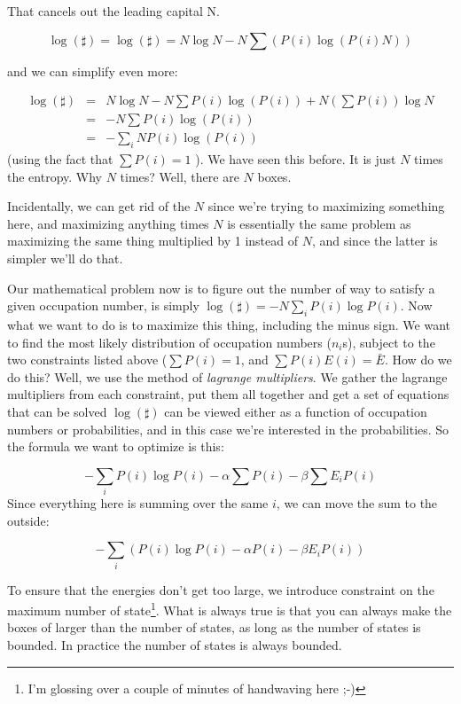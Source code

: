 \documentclass[a4, 12pt, english, USenglish]{scrreprt}
\newcommand{\parens}[1]{\ensuremath{\left({#1}\right)}}
\newcommand{\idx}[1]{{\em #1}\index{#1}}
\begin{document}
That cancels out the leading capital N.

\[
 \log(\sharp) = \log(\sharp) = N \log N  - N \sum\parens{P(i) \log\parens{P(i) N}}
\]
 
and we can simplify even more:

\[
\begin{array}{lcl}
 \log(\sharp) &=& N \log N - N \sum P(i) \log(P(i))+   N \parens{\sum P(i)} \log N\\
&=& - N \sum P(i) \log(P(i)) \\
&=& -  \sum_i N P(i) \log(P(i))
\end{array}
\]
(using the fact that \(\sum P(i) = 1\) ).  We have seen this before.
It is just \(N\) times the entropy.  Why \(N\) times? Well, there are
\(N\) boxes.


Incidentally, we can get rid of the \(N\) since we're trying to
maximizing something here, and maximizing anything times \(N\) is
essentially the same problem as maximizing the same thing multiplied
by 1 instead of \(N\), and since the latter is simpler we'll do that.


Our mathematical problem now is to figure out the number of way to
satisfy a given occupation number,  is simply \( \log(\sharp) = - N \sum_i P(i) \log
P(i) \).  Now what we want to do is to maximize this thing, including
the minus sign.  We want to find the most likely distribution of
occupation numbers (\(n_i\)s), subject to the two constraints listed above
(\(\sum P(i) = 1\), and \(\sum P(i) E(i) = \bar{E}\).  How do we
do this? Well, we use the method of \idx{lagrange multipliers}.  We
gather the lagrange multipliers from each constraint, put them all
together and get a set of equations that can be solved
\(\log(\sharp)\) can be viewed either as a function of occupation
numbers or probabilities, and in this case we're interested in the
probabilities. So the formula we want to optimize is this:

\[
- \sum_i P(i) \log P(i)  - \alpha \sum P(i) - \beta \sum E_i P(i)
\]
Since everything here is summing over the same \(i\), we can move the
sum to the outside:

\[
- \sum_i \parens{ P(i) \log P(i)  - \alpha P(i) - \beta E_i P(i)}
\]

To ensure that the energies don't get too large, we introduce
constraint on the maximum number of state\footnote{I'm glossing over a couple
of minutes of handwaving here ;-)}.  What is always true is that you
can always make the boxes  of larger than the number of states, as
long as the number of states is bounded. In practice the number of
states is always bounded.
\end{document}
